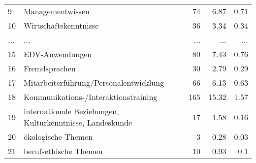 \begin{longtable}{lXrrr}
        9 & \multicolumn{1}{X}{Managementwissen} & %
          \num{74} &
          \num[round-mode=places,round-precision=2]{6.87} &
          \num[round-mode=places,round-precision=2]{0.71} \\
        10 & \multicolumn{1}{X}{Wirtschaftskenntnisse} & %
          \num{36} &
          \num[round-mode=places,round-precision=2]{3.34} &
          \num[round-mode=places,round-precision=2]{0.34} \\
       ... & ... & ... & ... & ... \\
        15 & \multicolumn{1}{X}{EDV-Anwendungen} & %
          \num{80} &
          \num[round-mode=places,round-precision=2]{7.43} &
          \num[round-mode=places,round-precision=2]{0.76} \\

        16 & \multicolumn{1}{X}{Fremdsprachen} & %
          \num{30} &
          \num[round-mode=places,round-precision=2]{2.79} &
          \num[round-mode=places,round-precision=2]{0.29} \\

        17 & \multicolumn{1}{X}{Mitarbeiterführung/Personalentwicklung} & %
          \num{66} &
          \num[round-mode=places,round-precision=2]{6.13} &
          \num[round-mode=places,round-precision=2]{0.63} \\

        18 & \multicolumn{1}{X}{Kommunikations-/Interaktionstraining} & %
          \num{165} &
          \num[round-mode=places,round-precision=2]{15.32} &
          \num[round-mode=places,round-precision=2]{1.57} \\

        19 & \multicolumn{1}{X}{internationale Beziehungen, Kulturkenntnisse, Landeskunde} & %
          \num{17} &
          \num[round-mode=places,round-precision=2]{1.58} &
          \num[round-mode=places,round-precision=2]{0.16} \\

        20 & \multicolumn{1}{X}{ökologische Themen} & %
          \num{3} &
          \num[round-mode=places,round-precision=2]{0.28} &
          \num[round-mode=places,round-precision=2]{0.03} \\

        21 & \multicolumn{1}{X}{berufsethische Themen} & %
          \num{10} &
          \num[round-mode=places,round-precision=2]{0.93} &
          \num[round-mode=places,round-precision=2]{0.1} \\


\end{longtable}
